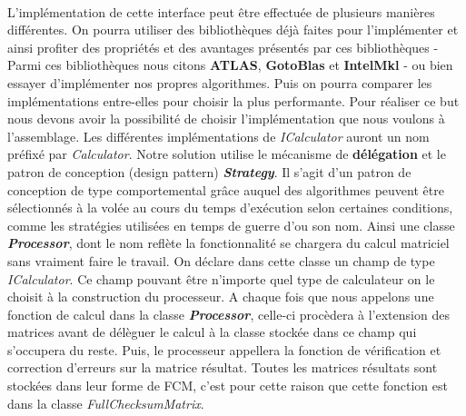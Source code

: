 \documentclass[a4paper, 10pt]{report}
\begin{document}
\paragraph*{}
L’implémentation de cette interface peut être effectuée de plusieurs manières différentes. On pourra utiliser 
des bibliothèques déjà faites pour l’implémenter et ainsi profiter des propriétés et des avantages présentés 
par ces bibliothèques - Parmi ces bibliothèques nous citons \textbf{ATLAS}, \textbf{GotoBlas} et \textbf{IntelMkl} - 
ou bien essayer d’implémenter nos propres algorithmes. Puis on pourra comparer les implémentations entre-elles pour choisir 
la plus performante. Pour réaliser ce but nous devons avoir la possibilité de choisir l’implémentation que nous 
voulons à l’assemblage. Les différentes implémentations de \textit{ICalculator} auront un nom préfixé par \textit{Calculator}. 
Notre solution utilise le mécanisme de \textbf{délégation} et le patron de conception (design pattern) \textbf{\textit{Strategy}}. 
Il s’agit d’un patron de conception de type comportemental grâce auquel des algorithmes peuvent être sélectionnés à la 
volée au cours du temps d'exécution selon certaines conditions, comme les stratégies utilisées en temps de guerre d’ou son nom.
\newline
Ainsi une classe \textbf{\textit{Processor}}, dont le nom reflète la fonctionnalité se chargera du calcul matriciel sans vraiment faire 
le travail. On déclare dans cette classe un champ de type \textit{ICalculator}. Ce champ pouvant être n’importe quel 
type de calculateur on le choisit à la construction du processeur. A chaque fois que nous appelons une fonction de calcul 
dans la classe \textbf{\textit{Processor}}, celle-ci procèdera à l'extension des matrices avant de délèguer le calcul à la 
classe stockée dans ce champ qui s’occupera du reste. Puis, le processeur appellera la fonction de vérification et 
correction d’erreurs sur la matrice résultat. Toutes les matrices résultats sont stockées dans leur forme de FCM, 
c’est pour cette raison que cette fonction est dans la classe \textit{FullChecksumMatrix}.
\end{document}
